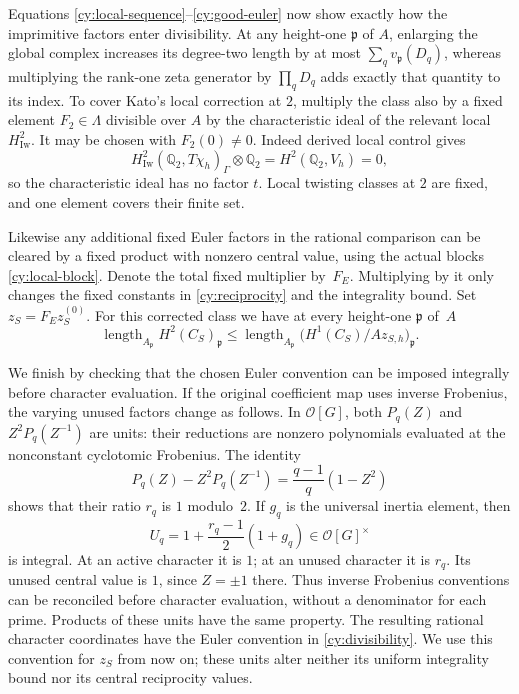 Equations \eqref{cy:local-sequence}--\eqref{cy:good-euler} now show exactly
how the imprimitive factors enter divisibility.  At any height-one
$\mathfrak p$ of $A$, enlarging the global complex increases its
degree-two length by at most $\sum_qv_{\mathfrak p}(D_q)$, whereas
multiplying the rank-one zeta generator by $\prod_qD_q$ adds exactly
that quantity to its index.  To cover Kato's local correction at $2$,
multiply the class also by a fixed element $F_2\in\Lambda$ divisible over $A$ by the
characteristic ideal of the relevant local $H^2_{\mathrm{Iw}}$.
It may be chosen with $F_2(0)\ne0$.  Indeed derived local control gives
\[
 H^2_{\mathrm{Iw}}(\mathbb Q _2,T\chi_h)_\Gamma\otimes\mathbb Q _2
       =H^2(\mathbb Q _2,V_h)=0,
\]
so the characteristic ideal has no factor $t$.  Local twisting classes
at $2$ are fixed, and one element covers their finite set.

Likewise any additional fixed Euler factors in the rational comparison
can be cleared by a fixed product with nonzero central value, using the
actual blocks \eqref{cy:local-block}.  Denote the total fixed multiplier
by~$F_E$.  Multiplying by it only changes the fixed constants in
\eqref{cy:reciprocity} and the integrality bound.  Set
$z_S=F_Ez_S^{(0)}$.  For this corrected class we have at every
height-one $\mathfrak p$ of~$A$
\begin{equation}\label{cy:divisibility}
 \operatorname{length}_{A_{\mathfrak p}}H^2(C_S)_{\mathfrak p}
 \leq
 \operatorname{length}_{A_{\mathfrak p}}
       \bigl(H^1(C_S)/Az_{S,h}\bigr)_{\mathfrak p}.
\end{equation}

We finish by checking that the chosen Euler convention can be imposed
integrally before character evaluation.  If the original coefficient
map uses inverse Frobenius, the varying unused factors change as follows.
In $\mathcal O[G]$, both $P_q(Z)$ and $Z^2P_q(Z^{-1})$ are units: their
reductions are nonzero polynomials evaluated at the nonconstant
cyclotomic Frobenius.  The identity
\[
 P_q(Z)-Z^2P_q(Z^{-1})=\frac{q-1}{q}(1-Z^2)
\]
shows that their ratio $r_q$ is $1$ modulo~$2$.  If $g_q$ is the universal
inertia element, then
\begin{equation}\label{cy:euler-convention}
 U_q=1+\frac{r_q-1}{2}(1+g_q)\in\mathcal O[G]^\times
\end{equation}
is integral.  At an active character it is $1$; at an unused character
it is $r_q$.  Its unused central value is $1$, since $Z=\pm1$ there.
Thus inverse Frobenius conventions can be reconciled before character
evaluation, without a denominator for each prime.  Products of these
units have the same property.  The resulting rational character
coordinates have the Euler convention in \eqref{cy:divisibility}.
We use this convention for $z_S$ from now on; these units alter neither
its uniform integrality bound nor its central reciprocity values.

